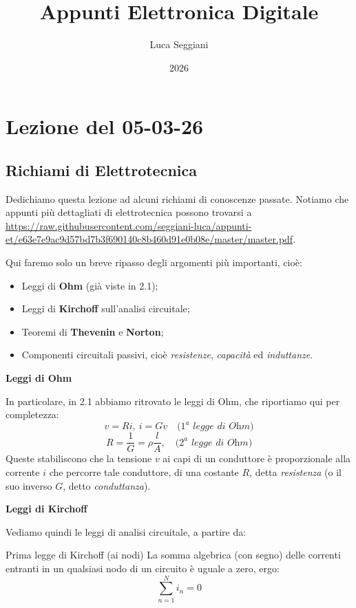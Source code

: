 \documentclass[a4paper,11pt]{article}
\title{Appunti Elettronica Digitale}
\author{Luca Seggiani}
\date{2026}
\begin{document}
\section{Lezione del 05-03-26}

\thispagestyle{empty}
\pagestyle{fancy}

\subsection{Richiami di Elettrotecnica}
Dedichiamo questa lezione ad alcuni richiami di conoscenze passate. Notiamo che appunti più dettagliati di elettrotecnica possono trovarsi a \url{https://raw.githubusercontent.com/seggiani-luca/appunti-et/e63e7e9ac9d57bd7b3f690140c8b460d91e0b08e/master/master.pdf}. 

\newpage

Qui faremo solo un breve ripasso degli argomenti più importanti, cioè:
\begin{itemize}
	\item Leggi di \textbf{Ohm} (già viste in 2.1);
	\item Leggi di \textbf{Kirchoff} sull'analisi circuitale;
	\item Teoremi di \textbf{Thevenin} e \textbf{Norton};
	\item Componenti circuitali passivi, cioè \textit{resistenze}, \textit{capacità} ed \textit{induttanze}.
\end{itemize}

\par\smallskip

\noindent
\textbf{\textsf{Leggi di Ohm}}

\noindent
In particolare, in 2.1 abbiamo ritrovato le leggi di Ohm, che riportiamo qui per completezza:
$$
v = Ri, \ i = G v \quad \textit{($1^a$ legge di Ohm)}
$$
$$
R = \frac{1}{G} = \rho \frac{l}{A}, \quad \textit{($2^a$ legge di Ohm)}
$$
Queste stabiliscono che la tensione $v$ ai capi di un conduttore è proporzionale alla corrente $i$ che percorre tale conduttore, di una costante $R$, detta \textit{resistenza} (o il suo inverso $G$, detto \textit{conduttanza}).

\par\smallskip

\noindent
\textbf{\textsf{Leggi di Kirchoff}}

\noindent
Vediamo quindi le leggi di analisi circuitale, a partire da:
\begin{theorem}{Prima legge di Kirchoff (ai nodi)}
La somma algebrica (con segno) delle correnti entranti in un qualsiasi nodo di un circuito è uguale a zero, ergo:
$$
\sum_{n=1}^N i_n = 0
$$
\end{theorem}
\end{document}

